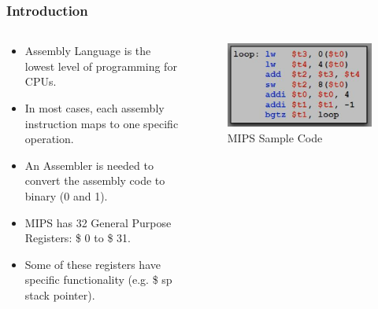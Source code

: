 \documentclass[
	11pt, %
]{beamer}
\begin{document}
\begin{frame}
	\frametitle{Introduction}
	\begin{columns}[c] %
		\begin{column}{0.6\textwidth} %
			\begin{itemize}
				\item Assembly Language is the lowest level of programming for CPUs. 
				\item In most cases, each assembly instruction maps to one specific operation.
				\item An Assembler is needed to convert the assembly code to binary (0 and 1).
				\item MIPS has 32 General Purpose Registers: \$ 0 to \$ 31.
				\item Some of these registers have specific functionality (e.g. \$ sp stack pointer).
			\end{itemize}
		\end{column}
	
		\begin{column}{0.4\textwidth} %
			\begin{figure}
				\includegraphics[width=\linewidth]{mips_sample_code.png}
				\caption{MIPS Sample Code}
			\end{figure}
		\end{column}
	\end{columns}
\end{frame}
\end{document}
